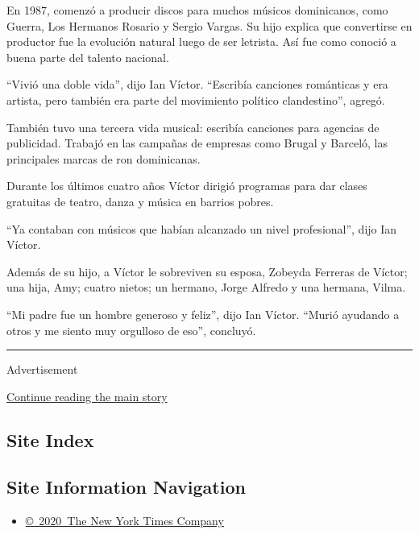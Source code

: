 En 1987, comenzó a producir discos para muchos músicos dominicanos, como
Guerra, Los Hermanos Rosario y Sergio Vargas. Su hijo explica que
convertirse en productor fue la evolución natural luego de ser letrista.
Así fue como conoció a buena parte del talento nacional.

``Vivió una doble vida'', dijo Ian Víctor. ``Escribía canciones
románticas y era artista, pero también era parte del movimiento político
clandestino'', agregó.

También tuvo una tercera vida musical: escribía canciones para agencias
de publicidad. Trabajó en las campañas de empresas como Brugal y
Barceló, las principales marcas de ron dominicanas.

Durante los últimos cuatro años Víctor dirigió programas para dar clases
gratuitas de teatro, danza y música en barrios pobres.

``Ya contaban con músicos que habían alcanzado un nivel profesional'',
dijo Ian Víctor.

Además de su hijo, a Víctor le sobreviven su esposa, Zobeyda Ferreras de
Víctor; una hija, Amy; cuatro nietos; un hermano, Jorge Alfredo y una
hermana, Vilma.

``Mi padre fue un hombre generoso y feliz'', dijo Ian Víctor. ``Murió
ayudando a otros y me siento muy orgulloso de eso'', concluyó.

\begin{center}\rule{0.5\linewidth}{\linethickness}\end{center}

Advertisement

\protect\hyperlink{after-bottom}{Continue reading the main story}

\hypertarget{site-index}{%
\subsection{Site Index}\label{site-index}}

\hypertarget{site-information-navigation}{%
\subsection{Site Information
Navigation}\label{site-information-navigation}}

\begin{itemize}
\tightlist
\item
  \href{https://help.nytimes.com/hc/en-us/articles/115014792127-Copyright-notice}{©~2020~The
  New York Times Company}
\end{itemize}

